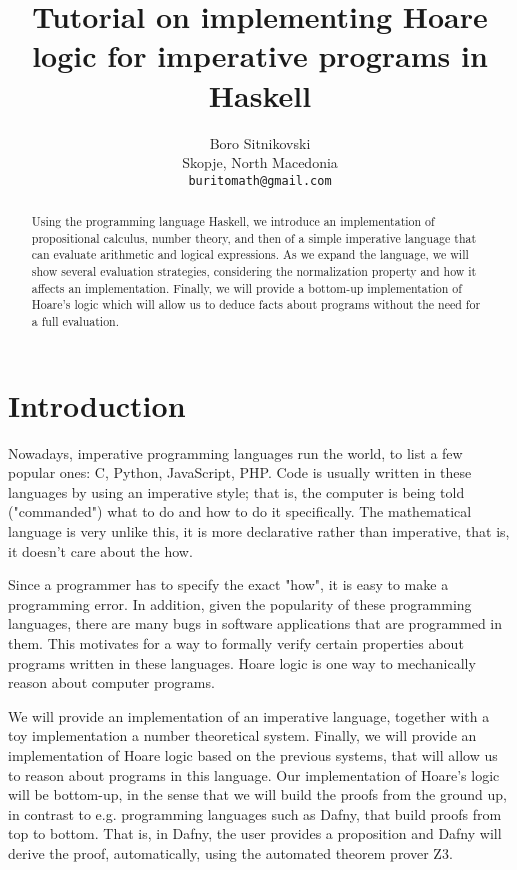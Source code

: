 \documentclass{article}
\title{Tutorial on implementing Hoare logic for imperative programs in Haskell}
\author{
  Boro Sitnikovski \\
  Skopje, North Macedonia \\
  \texttt{buritomath@gmail.com} \\
}
\begin{document}
\maketitle

\begin{abstract}
Using the programming language Haskell, we introduce an implementation of propositional calculus, number theory, and then of a simple imperative language that can evaluate arithmetic and logical expressions. As we expand the language, we will show several evaluation strategies, considering the normalization property and how it affects an implementation. Finally, we will provide a bottom-up implementation of Hoare's logic which will allow us to deduce facts about programs without the need for a full evaluation.
\end{abstract}


\section{Introduction}

Nowadays, imperative programming languages run the world, to list a few popular ones: C, Python, JavaScript, PHP. Code is usually written in these languages by using an imperative style; that is, the computer is being told ("commanded") what to do and how to do it specifically. The mathematical language is very unlike this, it is more declarative rather than imperative, that is, it doesn't care about the how.

Since a programmer has to specify the exact "how", it is easy to make a programming error. In addition, given the popularity of these programming languages, there are many bugs in software applications that are programmed in them. This motivates for a way to formally verify certain properties about programs written in these languages. Hoare logic is one way to mechanically reason about computer programs.

We will provide an implementation of an imperative language, together with a toy implementation a number theoretical system. Finally, we will provide an implementation of Hoare logic based on the previous systems, that will allow us to reason about programs in this language. Our implementation of Hoare's logic will be bottom-up, in the sense that we will build the proofs from the ground up, in contrast to e.g. programming languages such as Dafny\cite{b1}, that build proofs from top to bottom. That is, in Dafny, the user provides a proposition and Dafny will derive the proof, automatically, using the automated theorem prover Z3\cite{b2}.
\end{document}
